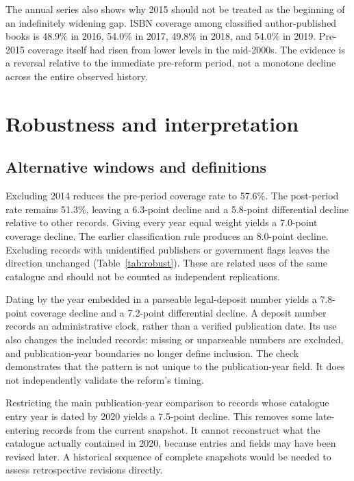 \documentclass[11pt]{article}
\begin{document}
The annual series also shows why 2015 should not be treated as the beginning of an indefinitely widening gap. ISBN coverage among classified author-published books is 48.9\% in 2016, 54.0\% in 2017, 49.8\% in 2018, and 54.0\% in 2019. Pre-2015 coverage itself had risen from lower levels in the mid-2000s. The evidence is a reversal relative to the immediate pre-reform period, not a monotone decline across the entire observed history.

\section{Robustness and interpretation}

\subsection{Alternative windows and definitions}



Excluding 2014 reduces the pre-period coverage rate to 57.6\%. The post-period rate remains 51.3\%, leaving a 6.3-point decline and a 5.8-point differential decline relative to other records. Giving every year equal weight yields a 7.0-point coverage decline. The earlier classification rule produces an 8.0-point decline. Excluding records with unidentified publishers or government flags leaves the direction unchanged (Table~\ref{tab:robust}). These are related uses of the same catalogue and should not be counted as independent replications.

Dating by the year embedded in a parseable legal-deposit number yields a 7.8-point coverage decline and a 7.2-point differential decline. A deposit number records an administrative clock, rather than a verified publication date. Its use also changes the included records: missing or unparseable numbers are excluded, and publication-year boundaries no longer define inclusion. The check demonstrates that the pattern is not unique to the publication-year field. It does not independently validate the reform's timing.

Restricting the main publication-year comparison to records whose catalogue entry year is dated by 2020 yields a 7.5-point decline. This removes some late-entering records from the current snapshot. It cannot reconstruct what the catalogue actually contained in 2020, because entries and fields may have been revised later. A historical sequence of complete snapshots would be needed to assess retrospective revisions directly.
\end{document}
